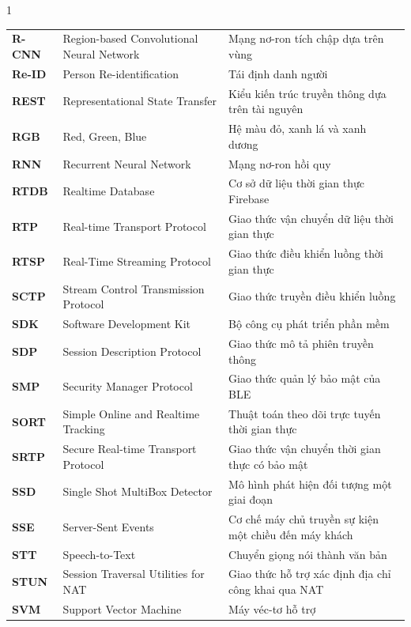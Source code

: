 \begin{spacing}{1}
\begin{longtable}{@{}>{\bfseries\color{HCMUTDarkBlue}}p{2.1cm}p{6.2cm}p{6.5cm}@{}}
  R-CNN  & Region-based Convolutional Neural Network       & Mạng nơ-ron tích chập dựa trên vùng \\
  Re-ID  & Person Re-identification                        & Tái định danh người \\
  REST   & Representational State Transfer                 & Kiểu kiến trúc truyền thông dựa trên tài nguyên \\
  RGB    & Red, Green, Blue                                & Hệ màu đỏ, xanh lá và xanh dương \\
  RNN    & Recurrent Neural Network                        & Mạng nơ-ron hồi quy \\
  RTDB   & Realtime Database                               & Cơ sở dữ liệu thời gian thực Firebase \\
  RTP    & Real-time Transport Protocol                    & Giao thức vận chuyển dữ liệu thời gian thực \\
  RTSP   & Real-Time Streaming Protocol                    & Giao thức điều khiển luồng thời gian thực \\
  SCTP   & Stream Control Transmission Protocol            & Giao thức truyền điều khiển luồng \\
  SDK    & Software Development Kit                        & Bộ công cụ phát triển phần mềm \\
  SDP    & Session Description Protocol                    & Giao thức mô tả phiên truyền thông \\
  SMP    & Security Manager Protocol                       & Giao thức quản lý bảo mật của BLE \\
  SORT   & Simple Online and Realtime Tracking             & Thuật toán theo dõi trực tuyến thời gian thực \\
  SRTP   & Secure Real-time Transport Protocol             & Giao thức vận chuyển thời gian thực có bảo mật \\
  SSD    & Single Shot MultiBox Detector                   & Mô hình phát hiện đối tượng một giai đoạn \\
  SSE    & Server-Sent Events                              & Cơ chế máy chủ truyền sự kiện một chiều đến máy khách \\
  STT    & Speech-to-Text                                  & Chuyển giọng nói thành văn bản \\
  STUN   & Session Traversal Utilities for NAT             & Giao thức hỗ trợ xác định địa chỉ công khai qua NAT \\
  SVM    & Support Vector Machine                          & Máy véc-tơ hỗ trợ \\

\end{longtable}
\end{spacing}
